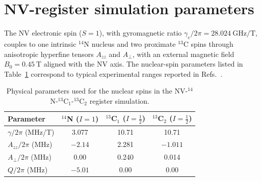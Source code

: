 \section{NV-register simulation parameters}
\label{app:nv_params}
\noindent
The NV electronic spin ($S{=}1$), with gyromagnetic ratio 
$\gamma_e/2\pi = 28.024~\text{GHz/T}$, couples to one intrinsic 
$^{14}$N nucleus and two proximate $^{13}$C spins through anisotropic 
hyperfine tensors $A_{zz}$ and $A_{\perp}$, with an external magnetic 
field $B_0 = 0.45~\text{T}$ aligned with the NV axis. 
The nuclear-spin parameters listed in Table~\ref{tab:nv_params_table} 
correspond to typical experimental ranges reported in 
Refs.~\cite{Chen,nizovtsev}.\\
\begin{table}[t]
\centering
\caption{Physical parameters used for the nuclear spins in the 
NV-$^{14}$N-$^{13}$C$_1$-$^{13}$C$_2$ register simulation.}
\label{tab:nv_params_table}
\begin{tabular}{lccc}
\toprule
Parameter & $^{14}$N ($I{=}1$) & $^{13}$C$_1$ ($I{=}\tfrac{1}{2}$) & $^{13}$C$_2$ ($I{=}\tfrac{1}{2}$) \\
\midrule
$\gamma/2\pi$ (MHz/T) & 3.077 & 10.71 & 10.71 \\
$A_{zz}/2\pi$ (MHz)                     & $-2.14$ & 2.281 & $-1.011$ \\
$A_{\perp}/2\pi$ (MHz)                  & 0.00 & 0.240 & 0.014 \\
$Q/2\pi$ (MHz)                          & $-5.01$ & 0.00 & 0.00 \\
\bottomrule
\end{tabular}
\end{table}


